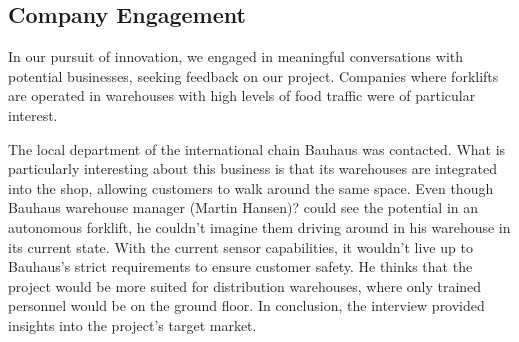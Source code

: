 \documentclass[../report.tex]{subfiles}
\begin{document}
\subsection{Company Engagement}
In our pursuit of innovation, we engaged in meaningful conversations with
potential businesses, seeking feedback on our project. Companies where
forklifts are operated in warehouses with high levels of food traffic were of
particular interest.

The local department of the international chain Bauhaus was contacted. What is
particularly interesting about this business is that its warehouses are
integrated into the shop, allowing customers to walk around the same space.
Even though Bauhaus warehouse manager (Martin Hansen)? could see the potential in
an autonomous forklift, he couldn't imagine them driving around in his
warehouse in its current state. With the current sensor capabilities, it
wouldn't live up to Bauhaus's strict requirements to ensure customer safety. He
thinks that the project would be more suited for distribution warehouses, where
only trained personnel would be on the ground floor. In conclusion, the
interview provided insights into the project's target market.
\end{document}
